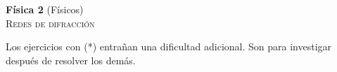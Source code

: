 \documentclass[11pt,spanish,a4paper]{article}
\begin{document}
\begin{center}
	\textbf{Física 2} (Físicos) \hfill {}\\
	\textsc{\LARGE Redes de difracción}
\end{center}

Los ejercicios con (*) entrañan una dificultad adicional. Son para investigar después de resolver los demás.


\begin{enumerate}





\end{enumerate}
\end{document}
